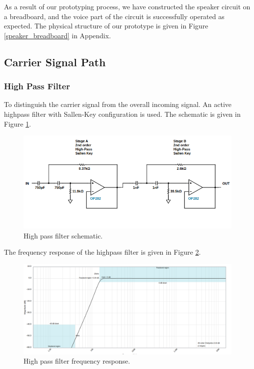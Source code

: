 \documentclass[a4paper,10pt]{IEEEtran}
\begin{document}
As a result of our prototyping process, we have constructed the speaker circuit on a breadboard, and the voice part of the circuit is successfully operated as expected. The physical structure of our prototype is given in Figure \ref{speaker_breadboard} in Appendix.

\subsection{Carrier Signal Path}
\subsubsection{High Pass Filter}
To distinguish the carrier signal from the overall incoming signal. An active highpass filter with Sallen-Key configuration is used. The schematic is given in Figure \ref{highpass}.
\begin{figure}[htbp!]
    \centering
    \includegraphics[width = 1\linewidth]{active_high_pass_circuit.png}
    \caption{High pass filter schematic. }
    \label{highpass}
\end{figure} 
The frequency response of the highpass filter is given in Figure \ref{highpass_resp}.
\begin{figure}[H]
    \centering
    \includegraphics[width = 1\linewidth]{active_high_pass.png}
    \caption{High pass filter frequency response.}
    \label{highpass_resp}
\end{figure} 
\end{document}
